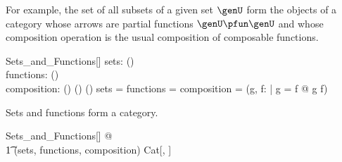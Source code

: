 \documentclass{amsart}
\begin{document}
For example, the set of all subsets of a given set $\genU$ form the objects of a category whose arrows are 
partial functions $\genU \pfun \genU$ and whose composition operation is the usual composition of composable functions.
\begin{schema}{Sets\_and\_Functions}[\genU]
	sets: \power(\power \genU) \\
	functions: \power(\genU \pfun \genU) \\
	composition: (\genU \pfun \genU) \cross (\genU \pfun \genU) \pfun (\genU \pfun \genU)
\where
	sets = \power \genU
\also
	functions = \genU \pfun \genU
\also
	composition = (\lambda g, f: \genU \pfun \genU | \dom g = \ran f @ g \circ f)
\end{schema}

\begin{example}
Sets and functions form a category.
\begin{zed}
	\forall Sets\_and\_Functions[\setU] @ \\
	\t1	(sets, functions, composition) \in Cat[\power \setU, \setU \pfun \setU]
\end{zed}
\end{example}


\printbibliography
\end{document}
